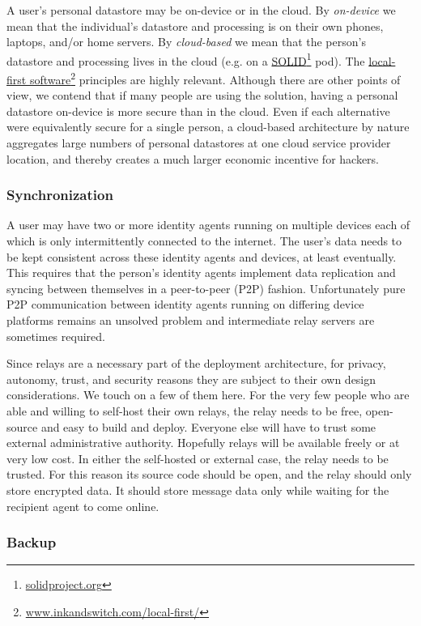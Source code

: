 \documentclass[11pt, oneside]{article}   	%
\newcommand{\hyperfootnote}[1][]{\def\ArgI{{#1}}\hyperfootnoteRelay}
\newcommand\hyperfootnoteRelay[2][]{\href{#1#2}{\ArgI}\footnote{\href{#1#2}{#2}}}
\begin{document}
A user's personal datastore may be on-device or in the cloud. By \emph{on-device} we mean that the individual's datastore and processing is on their own phones, laptops, and/or home servers. By \emph{cloud-based} we mean that the person's datastore and processing lives in the cloud (e.g. on a \hyperfootnote[SOLID][https://]{solidproject.org} pod). The \hyperfootnote[local-first software][https://]{www.inkandswitch.com/local-first/} principles are highly relevant. Although there are other points of view, we contend that if many people are using the solution, having a personal datastore on-device is more secure than in the cloud. Even if each alternative were equivalently secure for a single person, a cloud-based architecture by nature aggregates large numbers of personal datastores at one cloud service provider location, and thereby creates a much larger economic incentive for hackers. 

\subsubsection{Synchronization}

A user may have two or more identity agents running on multiple devices each of which is only intermittently connected to the internet. The user's data needs to be kept consistent across these identity agents and devices, at least eventually. This requires that the person's identity agents implement data replication and syncing between themselves in a peer-to-peer (P2P) fashion. Unfortunately pure P2P communication between identity agents running on differing device platforms remains an unsolved problem and intermediate relay servers are sometimes required. 

Since relays are a necessary part of the deployment architecture, for privacy, autonomy, trust, and security reasons they are subject to their own design considerations. We touch on a few of them here. For the very few people who are able and willing to self-host their own relays, the relay needs to be free, open-source and easy to build and deploy. Everyone else will have to trust some external administrative authority. Hopefully relays will be available freely or at very low cost. In either the self-hosted or external case, the relay needs to be trusted. For this reason its source code should be open, and the relay should only store encrypted data. It should store message data only while waiting for the recipient agent to come online.

\subsubsection{Backup} 
\end{document}
